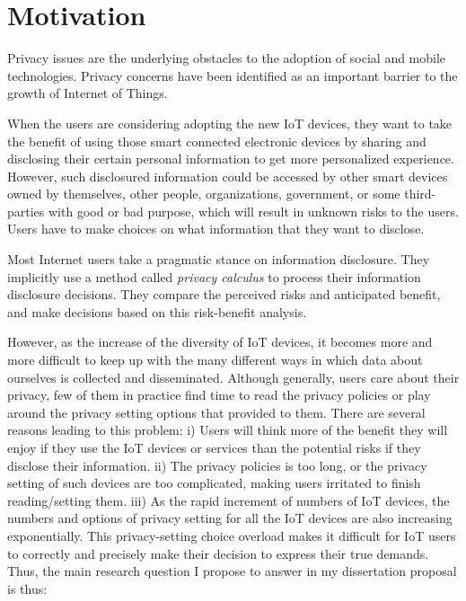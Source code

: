 \chapter{Motivation}\label{motivation}

Privacy issues are the underlying obstacles to the adoption of social and mobile technologies. Privacy concerns have been identified as an important barrier to the growth of Internet of Things. 

When the users are considering adopting the new IoT devices, they want to take the benefit of using those smart connected electronic devices by sharing and disclosing their certain personal information to get more personalized experience. However, such disclosured information could be accessed by other smart devices owned by themselves, other people, organizations, government, or some third-parties with good or bad purpose, which will result in unknown risks to the users. Users have to make choices on what information that they want to disclose.

Most Internet users take a pragmatic stance on information disclosure. They implicitly use a method called \textit{privacy calculus} to process their information disclosure decisions. They compare the perceived risks and anticipated benefit, and make decisions based on this risk-benefit analysis.

However, as the increase of the diversity of IoT devices, it becomes more and more difficult to keep up with the many different ways in which data about ourselves is collected and disseminated. Although generally, users care about their privacy, few of them in practice find time to read the privacy policies or play around the privacy setting options that provided to them. There are several reasons leading to this problem: i) Users will think more of the benefit they will enjoy if they use the IoT devices or services than the potential risks if they disclose their information. ii) The privacy policies is too long, or the privacy setting of such devices are too complicated, making users irritated to finish reading/setting them. iii) As the rapid increment of numbers of IoT devices, the numbers and options of privacy setting for all the IoT devices are also increasing exponentially. This privacy-setting choice overload makes it difficult for IoT users to correctly and precisely make their decision to express their true demands. Thus, the main research question I propose to answer in my dissertation proposal is thus:

